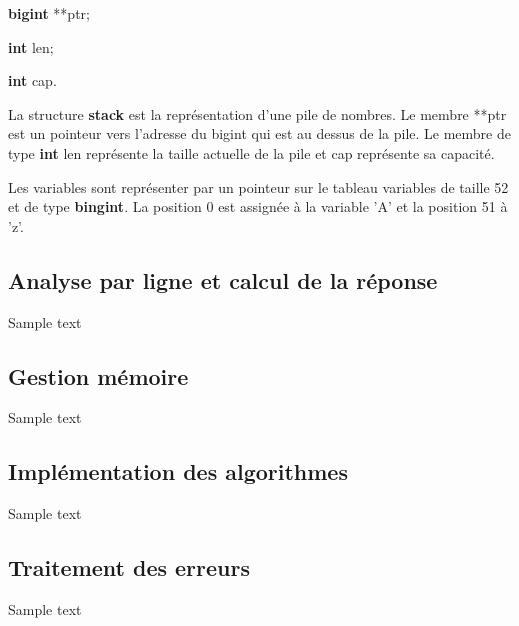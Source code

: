 \documentclass[]{report}
\begin{document}
\begin{normalsize}
	\begin{description}[noitemsep]
		\item \hspace{4mm}\textbf{bigint} **ptr;
		\item \hspace{4mm}\textbf{int} len;
		\item \hspace{4mm}\textbf{int} cap.
	\end{description}
	\par La structure \textbf{stack} est la représentation d'une pile de nombres. Le membre **ptr est un pointeur vers l'adresse du bigint qui est au dessus de la pile. Le membre de type  \textbf{int} len représente la taille actuelle de la pile et cap représente sa capacité.
		\vspace{4mm}
	\par Les variables sont représenter par un pointeur sur le tableau variables de taille 52 et de type \textbf{bingint}. La position 0 est assignée à la variable 'A' et la position 51 à 'z'.	
	\end{normalsize}
	\newpage
	
	\begin{normalsize}
		\section*{\LARGE Analyse par ligne et calcul de la réponse}
		Sample text
		\vspace{4mm}
	\end{normalsize}
	\begin{normalsize}
		\section*{\LARGE Gestion mémoire}
		Sample text
		\vspace{4mm}
	\end{normalsize}
	\begin{normalsize}
		\section*{\LARGE Implémentation des algorithmes}
		Sample text
		\vspace{4mm}
	\end{normalsize}
	\begin{normalsize}
		\section*{\LARGE Traitement des erreurs}
		Sample text
		\vspace{4mm}
	\end{normalsize}
\end{document}
